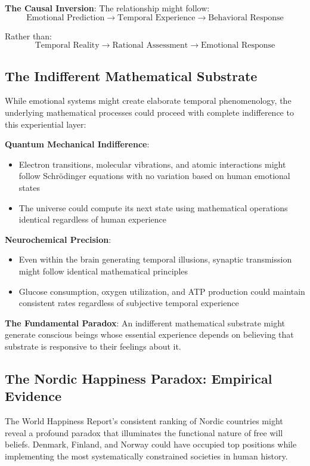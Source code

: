 \documentclass[12pt]{article}
\begin{document}
\textbf{The Causal Inversion}: The relationship might follow:
$$\text{Emotional Prediction} \rightarrow \text{Temporal Experience} \rightarrow \text{Behavioral Response}$$

Rather than:
$$\text{Temporal Reality} \rightarrow \text{Rational Assessment} \rightarrow \text{Emotional Response}$$

\subsection{The Indifferent Mathematical Substrate}

While emotional systems might create elaborate temporal phenomenology, the underlying mathematical processes could proceed with complete indifference to this experiential layer:

\textbf{Quantum Mechanical Indifference}:
\begin{itemize}
\item Electron transitions, molecular vibrations, and atomic interactions might follow Schrödinger equations with no variation based on human emotional states
\item The universe could compute its next state using mathematical operations identical regardless of human experience
\end{itemize}

\textbf{Neurochemical Precision}:
\begin{itemize}
\item Even within the brain generating temporal illusions, synaptic transmission might follow identical mathematical principles
\item Glucose consumption, oxygen utilization, and ATP production could maintain consistent rates regardless of subjective temporal experience
\end{itemize}

\textbf{The Fundamental Paradox}: An indifferent mathematical substrate might generate conscious beings whose essential experience depends on believing that substrate is responsive to their feelings about it.

\subsection{The Nordic Happiness Paradox: Empirical Evidence}

The World Happiness Report's consistent ranking of Nordic countries might reveal a profound paradox that illuminates the functional nature of free will beliefs. Denmark, Finland, and Norway could have occupied top positions while implementing the most systematically constrained societies in human history.
\end{document}
